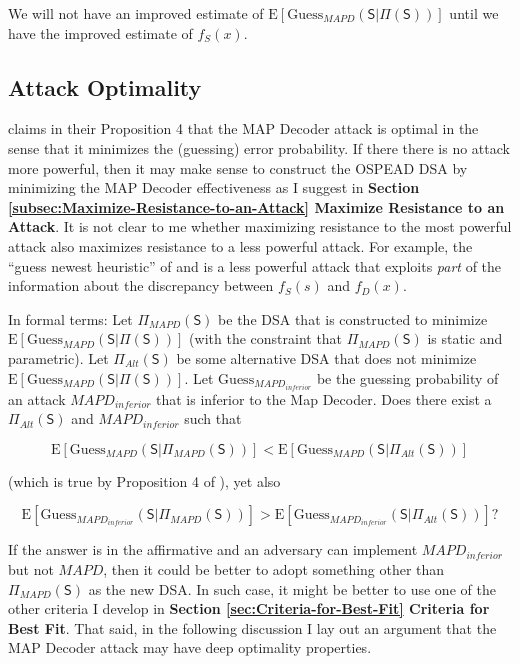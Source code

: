 \documentclass[english]{article}
\begin{document}
We will not have an improved estimate of $\mathrm{E}\left[\mathrm{Guess}_{MAPD}\left(\mathsf{S}|\Pi(\mathsf{S})\right)\right]$
until we have the improved estimate of $f_{S}(x)$.

\subsection{Attack Optimality}

\cite{Aeeneh2021} claims in their Proposition 4 that the MAP Decoder
attack is optimal in the sense that it minimizes the (guessing) error
probability. If there there is no attack more powerful, then it may
make sense to construct the OSPEAD DSA by minimizing the MAP Decoder
effectiveness as I suggest in \textbf{Section \ref{subsec:Maximize-Resistance-to-an-Attack}
Maximize Resistance to an Attack}. It is not clear to me whether maximizing
resistance to the most powerful attack also maximizes resistance to
a less powerful attack. For example, the ``guess newest heuristic''
of \cite{Kumar2017} and \cite{2018} is a less powerful attack that
exploits \textit{part} of the information about the discrepancy between
$f_{S}(s)$ and $f_{D}(x)$.

In formal terms: Let $\Pi_{MAPD}(\mathsf{S})$ be the DSA that is
constructed to minimize $\mathrm{E}\left[\mathrm{Guess}_{MAPD}\left(\mathsf{S}|\Pi(\mathsf{S})\right)\right]$
(with the constraint that $\Pi_{MAPD}(\mathsf{S})$ is static and
parametric). Let $\Pi_{Alt}(\mathsf{S})$ be some alternative DSA
that does not minimize $\mathrm{E}\left[\mathrm{Guess}_{MAPD}\left(\mathsf{S}|\Pi(\mathsf{S})\right)\right]$.
Let $\mathrm{Guess}_{MAPD_{inferior}}$ be the guessing probability
of an attack $MAPD_{inferior}$ that is inferior to the Map Decoder.
Does there exist a $\Pi_{Alt}(\mathsf{S})$ and $MAPD_{inferior}$
such that

\[
\mathrm{E}\left[\mathrm{Guess}_{MAPD}\left(\mathsf{S}|\Pi_{MAPD}(\mathsf{S})\right)\right]<\mathrm{E}\left[\mathrm{Guess}_{MAPD}\left(\mathsf{S}|\Pi_{Alt}(\mathsf{S})\right)\right]
\]

(which is true by Proposition 4 of \cite{Aeeneh2021}), yet also

\[
\mathrm{E}\left[\mathrm{Guess}_{MAPD_{inferior}}\left(\mathsf{S}|\Pi_{MAPD}(\mathsf{S})\right)\right]>\mathrm{E}\left[\mathrm{Guess}_{MAPD_{inferior}}\left(\mathsf{S}|\Pi_{Alt}(\mathsf{S})\right)\right]?
\]
 

If the answer is in the affirmative and an adversary can implement
$MAPD_{inferior}$ but not $MAPD$, then it could be better to adopt
something other than $\Pi_{MAPD}(\mathsf{S})$ as the new DSA. In
such case, it might be better to use one of the other criteria I develop
in \textbf{Section \ref{sec:Criteria-for-Best-Fit} Criteria for Best
Fit}. That said, in the following discussion I lay out an argument
that the MAP Decoder attack may have deep optimality properties.
\end{document}
